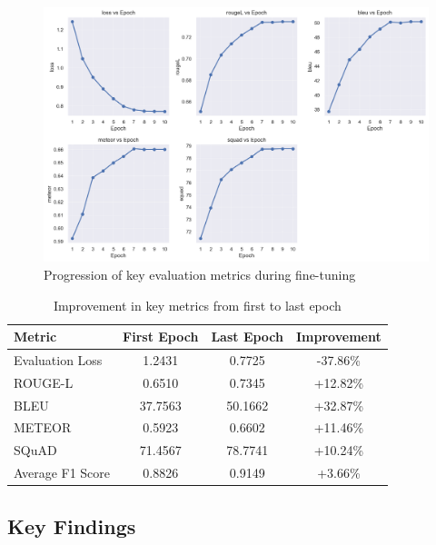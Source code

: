 \begin{figure}[h]
    \centering
    \includegraphics[width=\textwidth]{plots/main_metrics.png}
    \caption{Progression of key evaluation metrics during fine-tuning}
    \label{fig:main_metrics}
\end{figure}

\begin{table}[!h]
    \centering
    \setlength{\tabcolsep}{4pt}
    \renewcommand{\arraystretch}{1.3}
    \begin{tabular}{|l|c|c|c|}
        \hline
        \textbf{Metric} & \textbf{First Epoch} & \textbf{Last Epoch} & \textbf{Improvement} \\
        \hline
        Evaluation Loss & 1.2431 & 0.7725 & -37.86\% \\
        \hline
        ROUGE-L & 0.6510 & 0.7345 & +12.82\% \\
        \hline
        BLEU & 37.7563 & 50.1662 & +32.87\% \\
        \hline
        METEOR & 0.5923 & 0.6602 & +11.46\% \\
        \hline
        SQuAD & 71.4567 & 78.7741 & +10.24\% \\
        \hline
        Average F1 Score & 0.8826 & 0.9149 & +3.66\% \\
        \hline
    \end{tabular}
    \caption{Improvement in key metrics from first to last epoch}
    \label{tab:improvement_summary}
\end{table}

\subsection{Key Findings}


